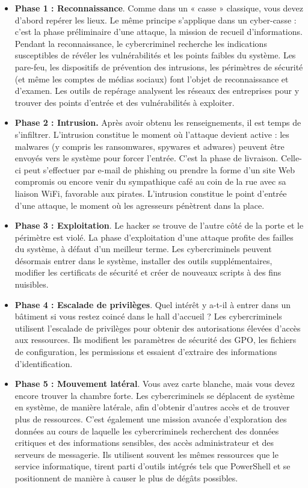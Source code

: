 \begin{itemize}
  \item \textbf{Phase 1 : Reconnaissance}. Comme dans un « casse » classique, vous devez d’abord repérer les lieux. Le même principe s’applique dans un cyber-casse : c’est la phase préliminaire d’une attaque, la mission de recueil d’informations. Pendant la reconnaissance, le cybercriminel recherche les indications susceptibles de révéler les vulnérabilités et les points faibles du système. Les pare-feu, les dispositifs de prévention des intrusions, les périmètres de sécurité (et même les comptes de médias sociaux) font l’objet de reconnaissance et d’examen. Les outils de repérage analysent les réseaux des entreprises pour y trouver des points d’entrée et des vulnérabilités à exploiter.

 \item \textbf{Phase 2 : Intrusion.} Après avoir obtenu les renseignements, il est temps de s’infiltrer. L’intrusion constitue le moment où l’attaque devient active : les malwares (y compris les ransomwares, spywares et adwares) peuvent être envoyés vers le système pour forcer l’entrée. C’est la phase de livraison. Celle-ci peut s’effectuer par e-mail de phishing ou prendre la forme d’un site Web compromis ou encore venir du sympathique café au coin de la rue avec sa liaison WiFi, favorable aux pirates. L’intrusion constitue le point d’entrée d’une attaque, le moment où les agresseurs pénètrent dans la place.

 \item \textbf{Phase 3 : Exploitation}. Le hacker se trouve de l’autre côté de la porte et le périmètre est violé. La phase d’exploitation d’une attaque profite des failles du système, à défaut d’un meilleur terme. Les cybercriminels peuvent désormais entrer dans le système, installer des outils supplémentaires, modifier les certificats de sécurité et créer de nouveaux scripts à des fins nuisibles.

 \item \textbf{Phase 4 : Escalade de privilèges}. Quel intérêt y a-t-il à entrer dans un bâtiment si vous restez coincé dans le hall d’accueil ? Les cybercriminels utilisent l’escalade de privilèges pour obtenir des autorisations élevées d’accès aux ressources. Ils modifient les paramètres de sécurité des GPO, les fichiers de configuration, les permissions et essaient d’extraire des informations d’identification.

 \item \textbf{Phase 5 : Mouvement latéral}. Vous avez carte blanche, mais vous devez encore trouver la chambre forte. Les cybercriminels se déplacent de système en système, de manière latérale, afin d’obtenir d’autres accès et de trouver plus de ressources. C’est également une mission avancée d’exploration des données au cours de laquelle les cybercriminels recherchent des données critiques et des informations sensibles, des accès administrateur et des serveurs de messagerie. Ils utilisent souvent les mêmes ressources que le service informatique, tirent parti d’outils intégrés tels que PowerShell et se positionnent de manière à causer le plus de dégâts possibles.


\end{itemize}
